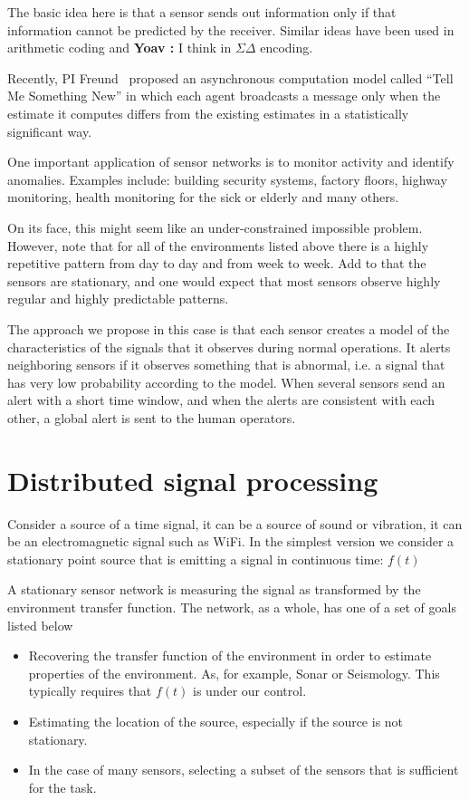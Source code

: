 \documentclass{article}
\newcommand{\comment}[3]{{\color{#1} {\bf #2 :} #3}}
\newcommand{\yoav}[1]{\comment{magenta}{Yoav}{#1}}
\begin{document}
The basic idea here is that a sensor sends out information only if
that information cannot be predicted by the receiver. Similar ideas
have been used in arithmetic coding and \yoav{I think} in
$\Sigma\Delta$ encoding.

Recently, PI Freund~\cite{TMSN} proposed an asynchronous computation
model called ``Tell Me Something New'' in which each agent broadcasts
a message only when the estimate it computes differs from the existing
estimates in a statistically significant way.

 One important application of sensor networks is to monitor activity
 and identify anomalies. Examples include: building security systems,
 factory floors, highway monitoring, health monitoring for the sick or
 elderly and many others.

 On its face, this might seem like an under-constrained impossible
 problem. However, note that for all of the environments listed above
 there is a highly repetitive pattern from day to day and from week to
 week. Add to that the sensors are stationary, and one would expect
 that most sensors observe highly regular and highly predictable
 patterns.
 
 The approach we propose in this case is that each sensor creates a
 model of the characteristics of the signals that it observes during
 normal operations. It alerts neighboring sensors if it observes
 something that is abnormal, i.e. a signal that has very low
 probability according to the model. When several sensors send an
 alert with a short time window, and when the alerts are consistent
 with each other, a global alert is sent to the human operators.

\section{Distributed signal processing}

Consider a source of a time signal, it can be a source of sound or vibration, it can be an electromagnetic signal such as WiFi. In the simplest version we consider a stationary point source that is emitting a signal in continuous time: $f(t)$

A stationary sensor network is measuring the signal as transformed by the environment transfer function. The network, as a whole, has one of a set of goals listed below

\begin{itemize}
    \item Recovering the transfer function of the environment in order to estimate properties of the environment. As, for example, Sonar or Seismology. This typically requires that $f(t)$ is under our control.
    \item Estimating the location of the source, especially if the source is not stationary.
    \item In the case of many sensors, selecting a subset of the sensors that is sufficient for the task.
\end{itemize}
\end{document}
